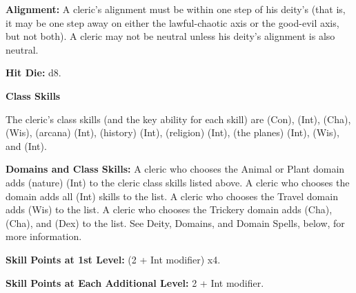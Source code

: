
\textbf{Alignment:} A cleric's alignment must be within one step of his deity's 
(that is, it may be one step away on either the lawful-chaotic axis or the good-evil 
axis, but not both). A cleric may not be neutral unless his deity's alignment is 
also neutral.

\textbf{Hit Die:} d8.

\textbf{Class Skills}

The cleric's class skills (and the key ability for each skill) are  
(Con),  (Int),  (Cha),  (Wis),  (arcana) (Int),  
(history) (Int),  (religion) (Int),  (the planes) (Int),  
(Wis), and  (Int). 

\textbf{Domains and Class Skills:} A cleric who chooses the Animal or Plant domain 
adds  (nature) (Int) to the cleric class skills listed above. A cleric 
who chooses the  domain adds all  (Int) skills to the list. A 
cleric who chooses the Travel domain adds  (Wis) to the list. A cleric 
who chooses the Trickery domain adds  (Cha),  (Cha), and  (Dex) 
to the list. See Deity, Domains, and Domain Spells, below, for more information.

\textbf{Skill Points at 1st Level:} (2 + Int modifier) x4.

\textbf{Skill Points at Each Additional Level:} 2 + Int modifier.


